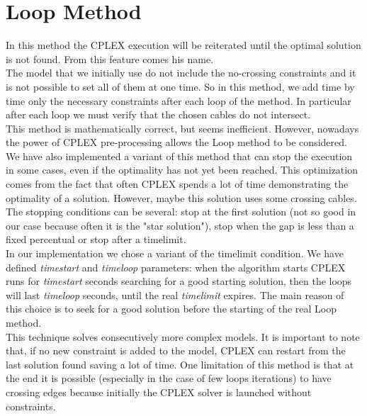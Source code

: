 \section{Loop Method}
In this method the \textsc{CPLEX} execution will be reiterated until the optimal solution is not found. From this feature comes his name. \\
The model that we initially use do not include the no-crossing constraints and it is not possible to set all of them at one time. So in this method, we add time by time only the necessary constraints after each loop of the method. In particular after each loop we must verify that the chosen cables do not intersect.\\
This method is mathematically correct, but seems inefficient. However, nowadays the power of \textsc{CPLEX} pre-processing allows the Loop method to be considered. We have also implemented a variant of this method that can stop the execution in some cases, even if the optimality has not yet been reached. This optimization comes from the fact that often \textsc{CPLEX} spends a lot of time demonstrating the optimality of a solution. However, maybe this solution uses some crossing cables. The stopping conditions can be several: stop at the first solution (not so good in our case because often it is the "star solution"), stop when the gap is less than a fixed percentual or stop after a timelimit. \\
In our implementation we chose a variant of the timelimit condition. We have defined \textit{timestart} and \textit{timeloop} parameters: when the algorithm starts \textsc{CPLEX} runs for \textit{timestart} seconds searching for a good starting solution, then the loops will last \textit{timeloop} seconds, until the real \textit{timelimit} expires. The main reason of this choice is to seek for a good solution before the starting of the real Loop method. \\ 
This technique solves consecutively more complex models. It is important to note that, if no new constraint is added to the model, \textsc{CPLEX} can restart from the last solution found saving a lot of time. One limitation of this method is that at the end it is possible (especially in the case of few loops iterations) to have crossing edges because initially the \textsc{CPLEX} solver is launched without constraints. 
